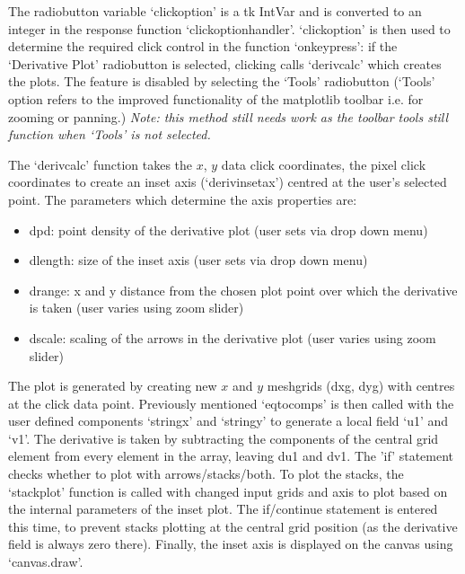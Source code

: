 \documentclass[11]{report}
\begin{document}
The radiobutton variable `click\textunderscore option' is a tk IntVar and is converted to an integer in the response function `click\textunderscore option\textunderscore handler'. `click\textunderscore option' is then used to determine the required click control in the function `on\textunderscore key\textunderscore press': if the `Derivative Plot' radiobutton is selected, clicking calls `deriv\textunderscore calc' which creates the plots. The feature is disabled by selecting the `Tools' radiobutton (`Tools' option refers to the improved functionality of the matplotlib toolbar i.e. for zooming or panning.) \textit{Note: this method still needs work as the toolbar tools still function when `Tools' is not selected.}

The `deriv\textunderscore calc' function takes the $x$, $y$ data click coordinates, the pixel click coordinates to create an inset axis (`deriv\textunderscore inset\textunderscore ax') centred at the user's selected point. The parameters which determine the axis properties are:
\begin{itemize}
	\item dpd: point density of the derivative plot (user sets via drop down menu)
	\item d\textunderscore length: size of the inset axis (user sets via drop down menu)
	\item d\textunderscore range: x and y distance from the chosen plot point over which the derivative is taken (user varies using zoom slider)
	\item d\textunderscore scale: scaling of the arrows in the derivative plot (user varies using zoom slider)
\end{itemize}

The plot is generated by creating new $x$ and $y$ meshgrids (dxg, dyg) with centres at the click data point. Previously mentioned `eq\textunderscore to\textunderscore comps' is then called with the user defined components `string\textunderscore x' and `string\textunderscore y' to generate a local field `u1' and `v1'. The derivative is taken by subtracting the components of the central grid element from every element in the array, leaving du1 and dv1. The 'if' statement checks whether to plot with arrows/stacks/both. To plot the stacks, the `stack\textunderscore plot' function is called with changed input grids and axis to plot based on the internal parameters of the inset plot. The if/continue statement is entered this time, to prevent stacks plotting at the central grid position (as the derivative field is always zero there). Finally, the inset axis is displayed on the canvas using `canvas.draw'. 
\end{document}
